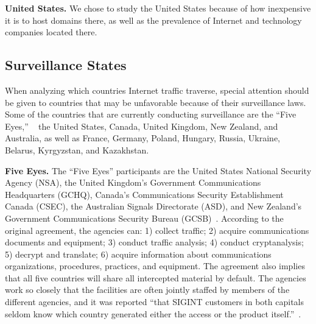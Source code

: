 {\bf United States.}  We chose to study the United States because of how inexpensive it is to host domains there, as well as the prevalence of Internet and technology companies located there.

\subsection{Surveillance States}

When analyzing which countries Internet traffic traverse, special attention should be given to countries that may be unfavorable because of their surveillance laws.  Some of the countries that are currently conducting surveillance are the ``Five Eyes,'' ~\cite{lander2004international, eyeswideopen} the United States, Canada, United Kingdom, New Zealand, and Australia, as well as France, Germany, Poland, Hungary, Russia, Ukraine, Belarus, Kyrgyzstan, and Kazakhstan.  

{\bf Five Eyes.} The ``Five Eyes'' participants are the United States National Security Agency (NSA), the United Kingdom's Government Communications Headquarters (GCHQ), Canada's Communications Security Establishment Canada (CSEC), the Australian Signals Directorate (ASD), and New Zealand's Government Communications Security Bureau (GCSB)~\cite{eyeswideopen}.  According to the original agreement, the agencies can: 1) collect traffic; 2) acquire communications documents and equipment; 3) conduct traffic analysis; 4) conduct cryptanalysis; 5) decrypt and translate; 6) acquire information about communications organizations, procedures, practices, and equipment.  The agreement also implies that all five countries will share all intercepted material by default.  The agencies work so closely that the facilities are often jointly staffed by members of the different agencies, and it was reported ``that SIGINT customers in both capitals seldom know which country generated either the access or the product itself.''~\cite{lander2004international}.


